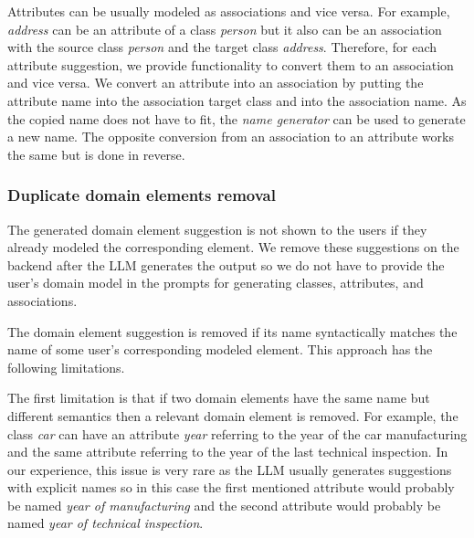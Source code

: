 Attributes can be usually modeled as associations and vice versa. For example, \textit{address} can be an attribute of a class \textit{person} but it also can be an association with the source class \textit{person} and the target class \textit{address}. Therefore, for each attribute suggestion, we provide functionality to convert them to an association and vice versa. We convert an attribute into an association by putting the attribute name into the association target class and into the association name. As the copied name does not have to fit, the \emph{name generator} can be used to generate a new name. The opposite conversion from an association to an attribute works the same but is done in reverse.


\subsubsection{Duplicate domain elements removal}
\label{duplicate_domain_elements}

The generated domain element suggestion is not shown to the users if they already modeled the corresponding element. We remove these suggestions on the backend after the LLM generates the output so we do not have to provide the user's domain model in the prompts for generating classes, attributes, and associations.

The domain element suggestion is removed if its name syntactically matches the name of some user's corresponding modeled element. This approach has the following limitations.

The first limitation is that if two domain elements have the same name but different semantics then a relevant domain element is removed. For example, the class \textit{car} can have an attribute \textit{year} referring to the year of the car manufacturing and the same attribute referring to the year of the last technical inspection. In our experience, this issue is very rare as the LLM usually generates suggestions with explicit names so in this case the first mentioned attribute would probably be named \textit{year of manufacturing} and the second attribute would probably be named \textit{year of technical inspection}.

